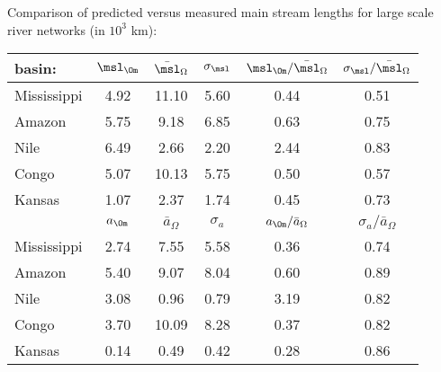 \begin{frame}[label=]
\begin{frame}[label=]
\begin{frame}[label=]
\begin{frame}[label=]
\begin{frame}[label=]
\begin{frame}[label=]
\begin{frame}[label=]
\begin{frame}[label=]
\begin{frame}[label=]
\begin{frame}[label=]
\begin{frame}[label=]
\begin{frame}[label=]
\begin{frame}[label=]
\begin{frame}[label=]
\begin{frame}[label=]
\begin{frame}[label=]
\begin{frame}[label=]
\begin{frame}[label=]
\begin{frame}[label=]
\begin{frame}[label=]
\begin{frame}[label=]
\begin{frame}[label=]
\begin{frame}[label=]
\begin{frame}[label=]
\begin{frame}[label=]
\begin{frame}[label=]
\begin{frame}[label=]
\begin{frame}[label=]
\begin{frame}[label=]
\begin{frame}[label=]
\begin{frame}[label=]
\begin{frame}[label=]
\begin{frame}[label=]
\begin{frame}[label=]
\begin{frame}[label=]
\begin{frame}[label=]
\begin{frame}[label=]
\begin{frame}[label=]
\begin{frame}[label=]
\begin{frame}[label=]
\begin{frame}[label=]
\begin{frame}[label=]
\begin{frame}[label=]
\begin{frame}[label=]
\begin{frame}[label=]
  Comparison of predicted versus measured main stream lengths
  for large scale river networks (in $10^3$ km):
  \begin{center}
    \begin{tabular}{lccccc}
      \hline
      basin: &  $\msl_\Om$ & $\bar{\msl}_\Omega$ & 
      $\sigma_\msl$ & $\msl_\Om/\bar{\msl}_\Omega$ & $\sigma_\msl/\bar{\msl}_\Omega$ \\ \hline
      Mississippi & 4.92 & 11.10 & 5.60 & 0.44 & 0.51 \\
      Amazon &  5.75 & 9.18 & 6.85 & 0.63 & 0.75 \\
      Nile & 6.49 & 2.66 & 2.20 & 2.44 & 0.83 \\
      Congo & 5.07 & 10.13 & 5.75 & 0.50 & 0.57 \\ 
      Kansas & 1.07 & 2.37 & 1.74 & 0.45 & 0.73 \\ \hline\hline
      & $a_\Om$ & $\bar{a}_\Omega$ & $\sigma_a$ & $a_\Om/\bar{a}_\Omega$ & $\sigma_a/\bar{a}_\Omega$ \\ \hline
      Mississippi & 2.74 & 7.55 & 5.58 & 0.36 & 0.74 \\
      Amazon & 5.40 & 9.07 & 8.04 & 0.60 & 0.89 \\
      Nile & 3.08 & 0.96 & 0.79 & 3.19 & 0.82 \\
      Congo & 3.70 & 10.09 & 8.28 & 0.37 & 0.82 \\
      Kansas & 0.14 & 0.49 & 0.42 & 0.28 & 0.86 \\
    \end{tabular}
  \end{center}




\end{frame}
\end{frame}
\end{frame}
\end{frame}
\end{frame}
\end{frame}
\end{frame}
\end{frame}
\end{frame}
\end{frame}
\end{frame}
\end{frame}
\end{frame}
\end{frame}
\end{frame}
\end{frame}
\end{frame}
\end{frame}
\end{frame}
\end{frame}
\end{frame}
\end{frame}
\end{frame}
\end{frame}
\end{frame}
\end{frame}
\end{frame}
\end{frame}
\end{frame}
\end{frame}
\end{frame}
\end{frame}
\end{frame}
\end{frame}
\end{frame}
\end{frame}
\end{frame}
\end{frame}
\end{frame}
\end{frame}
\end{frame}
\end{frame}
\end{frame}
\end{frame}
\end{frame}
